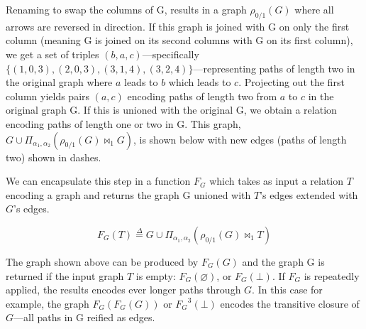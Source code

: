 Renaming to swap the columns of G, results in a graph $\rho_{0 / 1}(G)$ where all arrows are reversed in direction. If this graph is joined with G on only the first column (meaning G is joined on its second columns with G on its first column), we get a set of triples $(b,a,c)$---specifically $\{(1,0,3),(2,0,3),(3,1,4),(3,2,4)\}$---representing paths of length two in the original graph where $a$ leads to $b$ which leads to $c$. Projecting out the first column yields pairs $(a,c)$ encoding paths of length two from $a$ to $c$ in the original graph G. If this is unioned with the original G, we obtain a relation encoding paths of length one or two in G. This graph, $G \cup \Pi_{\alpha_1,\alpha_2}(\rho_{0 / 1}(G) \bowtie_1 G)$, is shown below with new edges (paths of length two) shown in dashes.

\begin{center}
\end{center}

We can encapsulate this step in a function $F_G$ which takes as input a relation $T$ encoding a graph and returns the graph G unioned with $T$'s edges extended with $G$'s edges.

\[
  F_G(T) \overset{\Delta}{=} G \cup \Pi_{\alpha_1,\alpha_2}(\rho_{0 / 1}(G) \bowtie_1 T)
\]

The graph shown above can be produced by $F_G(G)$ and the graph G is returned if the input graph $T$ is empty: $F_G(\varnothing)$, or $F_G(\bot)$. If $F_G$ is repeatedly applied, the results encodes ever longer paths through $G$. In this case for example, the graph $F_G(F_G(G))$ or ${F_G}^3(\bot)$ encodes the transitive closure of $G$---all paths in G reified as edges.

